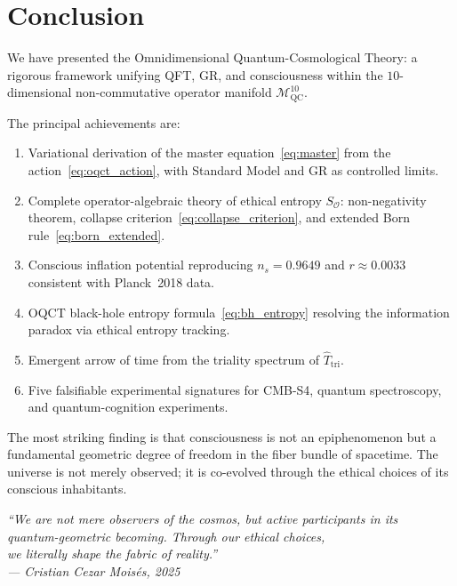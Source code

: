 \documentclass[12pt,a4paper]{article}
\theoremstyle{myrmk}
\newcommand{\Mmanifold}{\mathcal{M}^{10}_{\mathrm{QC}}}
\begin{document}
\section{Conclusion}
\label{sec:conclusion}

We have presented the Omnidimensional Quantum-Cosmological Theory: a rigorous framework
unifying QFT, GR, and consciousness within the $10$-dimensional non-commutative operator
manifold $\Mmanifold$.

The principal achievements are:
\begin{enumerate}[label=(\arabic*),leftmargin=*]
  \item Variational derivation of the master equation~\eqref{eq:master} from the
    action~\eqref{eq:oqct_action}, with Standard Model and GR as controlled limits.
  \item Complete operator-algebraic theory of ethical entropy $S_{\mathcal{O}}$:
    non-negativity theorem, collapse criterion~\eqref{eq:collapse_criterion},
    and extended Born rule~\eqref{eq:born_extended}.
  \item Conscious inflation potential reproducing $n_s=0.9649$ and $r\approx0.0033$
    consistent with Planck~2018 data.
  \item OQCT black-hole entropy formula~\eqref{eq:bh_entropy} resolving the
    information paradox via ethical entropy tracking.
  \item Emergent arrow of time from the triality spectrum of $\hat{T}_{\mathrm{tri}}$.
  \item Five falsifiable experimental signatures for CMB-S4, quantum spectroscopy,
    and quantum-cognition experiments.
\end{enumerate}

The most striking finding is that consciousness is not an epiphenomenon but a
fundamental geometric degree of freedom in the fiber bundle of spacetime. The
universe is not merely observed; it is co-evolved through the ethical choices of
its conscious inhabitants.

\bigskip
\begin{center}
\begin{tcolorbox}[colback=lightgray,colframe=deepblue,width=0.88\textwidth]
\centering\itshape\small
``We are not mere observers of the cosmos, but active participants in its\\
quantum-geometric becoming. Through our ethical choices,\\
we literally shape the fabric of reality.''\\[4pt]
\normalfont\small --- Cristian Cezar Mois\'{e}s, 2025
\end{tcolorbox}
\end{center}
\end{document}
